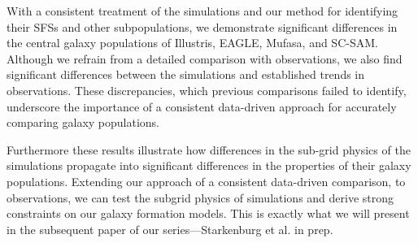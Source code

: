 \documentclass[tighten, preprint]{aastex62}
\begin{document}
With a consistent treatment of the simulations and our method
for identifying their SFSs and other subpopulations,
we demonstrate significant differences in the  
central galaxy populations of Illustris, EAGLE,  {\sc Mufasa}, and SC-SAM. %
Although we refrain from a detailed 
comparison with observations, we also find significant differences 
between the simulations and established trends in observations. These
discrepancies, which previous comparisons failed to identify, underscore 
the importance of a consistent data-driven approach for accurately comparing 
galaxy populations.

Furthermore these results illustrate how differences in the 
sub-grid physics of the simulations propagate into significant differences  
in the properties of their galaxy populations. Extending our approach of 
a consistent data-driven comparison, to observations, we can test the 
subgrid physics of simulations and derive strong constraints on our galaxy 
formation models. This is exactly what we will present in the subsequent 
paper of our series---Starkenburg et al. in prep.

\end{document}
